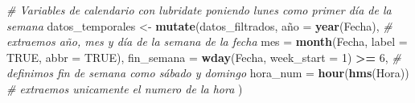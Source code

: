 \documentclass[notspecified,article,submit,oneauthor,pdftex]{Definitions/mdpi}
\newenvironment{Shaded}{\begin{snugshade}}{\end{snugshade}}
\newcommand{\AttributeTok}[1]{\textcolor[rgb]{0.13,0.29,0.53}{#1}}
\newcommand{\CommentTok}[1]{\textcolor[rgb]{0.56,0.35,0.01}{\textit{#1}}}
\newcommand{\ConstantTok}[1]{\textcolor[rgb]{0.56,0.35,0.01}{#1}}
\newcommand{\DecValTok}[1]{\textcolor[rgb]{0.00,0.00,0.81}{#1}}
\newcommand{\FunctionTok}[1]{\textcolor[rgb]{0.13,0.29,0.53}{\textbf{#1}}}
\newcommand{\NormalTok}[1]{#1}
\newcommand{\OtherTok}[1]{\textcolor[rgb]{0.56,0.35,0.01}{#1}}
\newcommand{\SpecialCharTok}[1]{\textcolor[rgb]{0.81,0.36,0.00}{\textbf{#1}}}
\begin{document}
\begin{Shaded}
\begin{Highlighting}[]
\CommentTok{\# Variables de calendario con lubridate poniendo lunes como primer día de la semana}
\NormalTok{datos\_temporales }\OtherTok{\textless{}{-}} \FunctionTok{mutate}\NormalTok{(datos\_filtrados,}
\NormalTok{  año        }\OtherTok{=} \FunctionTok{year}\NormalTok{(Fecha), }\CommentTok{\# extraemos año, mes y día de la semana de la fecha}
  \AttributeTok{mes        =} \FunctionTok{month}\NormalTok{(Fecha, }\AttributeTok{label =} \ConstantTok{TRUE}\NormalTok{, }\AttributeTok{abbr =} \ConstantTok{TRUE}\NormalTok{),}
  \AttributeTok{fin\_semana =} \FunctionTok{wday}\NormalTok{(Fecha, }\AttributeTok{week\_start =} \DecValTok{1}\NormalTok{) }\SpecialCharTok{\textgreater{}=} \DecValTok{6}\NormalTok{, }\CommentTok{\# definimos fin de semana como sábado y domingo}
  \AttributeTok{hora\_num   =} \FunctionTok{hour}\NormalTok{(}\FunctionTok{hms}\NormalTok{(Hora)) }\CommentTok{\# extraemos unicamente el numero de la hora}
\NormalTok{)}
\end{Highlighting}
\end{Shaded}
\end{document}
